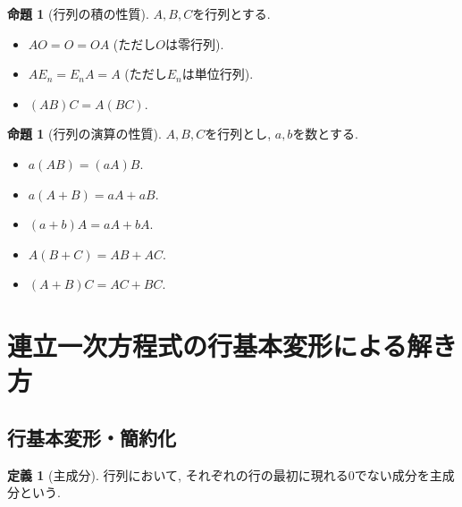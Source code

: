 \documentclass[dvipdfmx,a4paper,11pt]{article}
\theoremstyle{definition}
\newtheorem{prop}[thm]{命題}
\newtheorem{dfn}[thm]{定義}
\begin{document}
 \begin{tcolorbox}[
    colback = white,
    colframe = green!35!black,
    fonttitle = \bfseries,
    breakable = true]
    \begin{prop}[行列の積の性質]
$A,B,C$を行列とする.
 \begin{itemize}
 	\setlength{\parskip}{0cm}
  	\setlength{\itemsep}{0pt} 
 \item $AO =O = OA$ (ただし$O$は零行列).
  \item $AE_{n}=E_{n}A =A$ (ただし$E_n$は単位行列). 
  \item $(AB)C = A(BC)$.　
 \end{itemize}
  \end{prop}
 \end{tcolorbox}

 \begin{tcolorbox}[
    colback = white,
    colframe = green!35!black,
    fonttitle = \bfseries,
    breakable = true]
    \begin{prop}[行列の演算の性質]
$A,B,C$を行列とし, $a,b$を数とする.
 \begin{itemize}
 	\setlength{\parskip}{0cm}
  	\setlength{\itemsep}{0pt} 
 \item $a(AB)=(aA)B$. 
  \item $a(A+B)=aA + aB$. 
  \item $(a+b)A = aA + bA$.　
  \item $A(B+C) = AB + AC$.
  \item $(A+B)C = AC + BC$.
 \end{itemize}
  \end{prop}
 \end{tcolorbox}


\newpage


\section{連立一次方程式の行基本変形による解き方}
\label{sec-6}

\subsection{行基本変形・簡約化}

\begin{tcolorbox}[
    colback = white,
    colframe = green!35!black,
    fonttitle = \bfseries,
    breakable = true]
    \begin{dfn}[主成分]
  行列において, それぞれの行の最初に現れる0でない成分を主成分という.
  \end{dfn}
 \end{tcolorbox}
 
\end{document}
